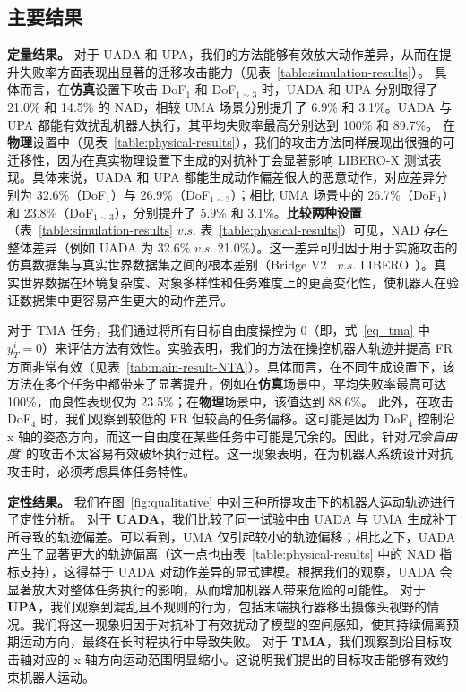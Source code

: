 \subsection{主要结果}\label{subsec:main_results}
\textbf{定量结果。} 
对于 UADA 和 UPA，我们的方法能够有效放大动作差异，从而在提升失败率方面表现出显著的迁移攻击能力（见表~\ref{table:simulation-results}）。
具体而言，在\textbf{仿真}设置下攻击 DoF$_1$ 和 DoF$_{1\sim3}$ 时，UADA 和 UPA 分别取得了 21.0\% 和 14.5\% 的 NAD，相较 UMA 场景分别提升了 6.9\% 和 3.1\%。UADA 与 UPA 都能有效扰乱机器人执行，其平均失败率最高分别达到 100\% 和 89.7\%。
在\textbf{物理}设置中（见表~\ref{table:physical-results}），我们的攻击方法同样展现出很强的可迁移性，因为在真实物理设置下生成的对抗补丁会显著影响 LIBERO-X 测试表现。具体来说，UADA 和 UPA 都能生成动作偏差很大的恶意动作，对应差异分别为 32.6\%（DoF$_1$）与 26.9\%（DoF$_{1\sim3}$）；相比 UMA 场景中的 26.7\%（DoF$_1$）和 23.8\%（DoF$_{1\sim3}$），分别提升了 5.9\% 和 3.1\%。\textbf{比较两种设置}（表~\ref{table:simulation-results} $v.s.$ 表~\ref{table:physical-results}）可见，NAD 存在整体差异（例如 UADA 为 32.6\% $v.s.$ 21.0\%）。这一差异可归因于用于实施攻击的仿真数据集与真实世界数据集之间的根本差别（Bridge V2~\cite{bridgev2} $v.s.$ LIBERO~\cite{LIBREO}）。真实世界数据在环境复杂度、对象多样性和任务难度上的更高变化性，使机器人在验证数据集中更容易产生更大的动作差异。

对于 TMA 任务，我们通过将所有目标自由度操控为 0（即，式~\ref{eq_tma} 中 $y^{i}_T=0$）来评估方法有效性。实验表明，我们的方法在操控机器人轨迹并提高 FR 方面非常有效（见表~\ref{tab:main-result-NTA}）。具体而言，在不同生成设置下，该方法在多个任务中都带来了显著提升，例如在\textbf{仿真}场景中，平均失败率最高可达 100\%，而良性表现仅为 23.5\%；在\textbf{物理}场景中，该值达到 88.6\%。
此外，在攻击 DoF$_4$ 时，我们观察到较低的 FR 但较高的任务偏移。这可能是因为 DoF$_4$ 控制沿 x 轴的姿态方向，而这一自由度在某些任务中可能是冗余的。因此，针对\textit{冗余自由度}~\cite{kurdila2019dynamics}的攻击不太容易有效破坏执行过程。这一现象表明，在为机器人系统设计对抗攻击时，必须考虑具体任务特性。

\textbf{定性结果。} 
我们在图~\ref{fig:qualitative} 中对三种所提攻击下的机器人运动轨迹进行了定性分析。
对于 \textbf{UADA}，我们比较了同一试验中由 UADA 与 UMA 生成补丁所导致的轨迹偏差。可以看到，UMA 仅引起较小的轨迹偏移；相比之下，UADA 产生了显著更大的轨迹偏离（这一点也由表~\ref{table:physical-results} 中的 NAD 指标支持），这得益于 UADA 对动作差异的显式建模。根据我们的观察，UADA 会显著放大对整体任务执行的影响，从而增加机器人带来危险的可能性。
对于 \textbf{UPA}，我们观察到混乱且不规则的行为，包括末端执行器移出摄像头视野的情况。我们将这一现象归因于对抗补丁有效扰动了模型的空间感知，使其持续偏离预期运动方向，最终在长时程执行中导致失败。
对于 \textbf{TMA}，我们观察到沿目标攻击轴对应的 x 轴方向运动范围明显缩小。这说明我们提出的目标攻击能够有效约束机器人运动。

